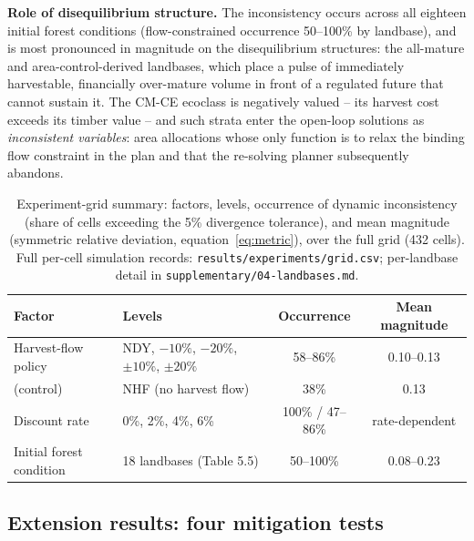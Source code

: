 \textbf{Role of disequilibrium structure.} The inconsistency occurs across all eighteen initial forest conditions (flow-constrained occurrence 50--100\% by landbase), and is most pronounced in magnitude on the disequilibrium structures: the all-mature and area-control-derived landbases, which place a pulse of immediately harvestable, financially over-mature volume in front of a regulated future that cannot sustain it. The CM-CE ecoclass is negatively valued -- its harvest cost exceeds its timber value -- and such strata enter the open-loop solutions as \emph{inconsistent variables}: area allocations whose only function is to relax the binding flow constraint in the plan and that the re-solving planner subsequently abandons.

\begin{table}[h]
\centering
\small
\caption{Experiment-grid summary: factors, levels, occurrence of dynamic inconsistency (share of cells exceeding the 5\% divergence tolerance), and mean magnitude (symmetric relative deviation, equation~\eqref{eq:metric}), over the full grid (432 cells). Full per-cell simulation records: \texttt{results/experiments/grid.csv}; per-landbase detail in \texttt{supplementary/04-landbases.md}.}
\label{tab:grid}
\begin{tabular}{@{}llcc@{}}
\toprule
Factor & Levels & Occurrence & Mean magnitude \\
\midrule
Harvest-flow policy & NDY, $-10\%$, $-20\%$, $\pm10\%$, $\pm20\%$ & 58--86\% & 0.10--0.13 \\
\quad (control) & NHF (no harvest flow) & 38\% & 0.13 \\
Discount rate & 0\%, 2\%, 4\%, 6\% & 100\% / 47--86\% & rate-dependent \\
Initial forest condition & 18 landbases (Table 5.5) & 50--100\% & 0.08--0.23 \\
\bottomrule
\end{tabular}
\end{table}

\subsection{Extension results: four mitigation tests}

